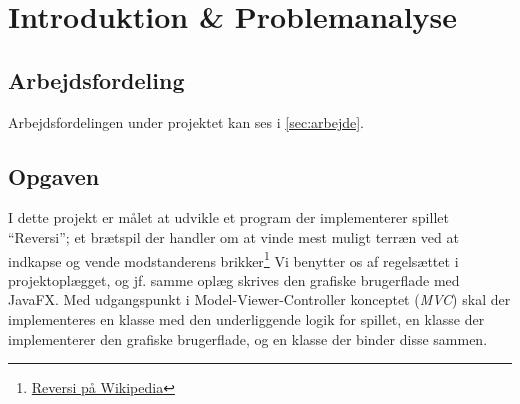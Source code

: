 \section{Introduktion \& Problemanalyse}
\subsection{Arbejdsfordeling}
Arbejdsfordelingen under projektet kan ses i \cref{sec:arbejde}.
\subsection{Opgaven}
I dette projekt er målet at udvikle et program der implementerer spillet ``Reversi''; et brætspil der handler om at vinde mest muligt terræn ved at indkapse og vende modstanderens brikker\footnote{\href{https://www.wikiwand.com/en/Reversi}{Reversi på Wikipedia}} Vi benytter os af regelsættet i projektoplægget, og jf. samme oplæg skrives den grafiske brugerflade med JavaFX.\newline
Med udgangspunkt i Model-Viewer-Controller konceptet (\emph{MVC}) skal der implementeres en klasse med den underliggende logik for spillet, en klasse der implementerer den grafiske brugerflade, og en klasse der binder disse sammen.
